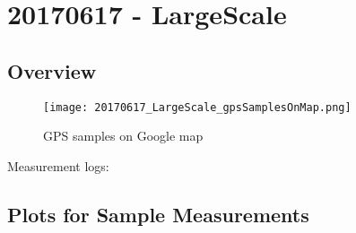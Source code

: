 \graphicspath{{../../../PostProcessingResults/SummaryReport/plots/}}
\section{20170617 - LargeScale}
\subsection{Overview}
\begin{figure}[ht] \caption{GPS samples on Google map}
\texttt{[image: 20170617\_LargeScale\_gpsSamplesOnMap.png]}\centering\end{figure}
\begin{minipage}{\textwidth} Measurement logs:

 \end{minipage}
\clearpage
\subsection{Plots for Sample Measurements}
